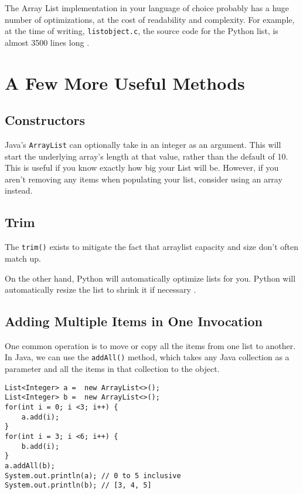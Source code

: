 The Array List implementation in your language of choice probably has a huge number of optimizations, at the cost of readability and complexity.  For example, at the time of writing, \texttt{listobject.c}, the source code for the Python list, is almost 3500 lines long \cite{py-list-source}.



\section{A Few More Useful Methods}

\subsection{Constructors}
Java's \texttt{ArrayList} can optionally take in an integer as an argument.
This will start the underlying array's length at that value, rather than the default of 10.
This is useful if you know exactly how big your List will be.  
However, if you aren't removing any items when populating your list, consider using an array instead.

\subsection{Trim}

The \texttt{trim()} exists to mitigate the fact that arraylist capacity and size don't often match up.



On the other hand, Python will automatically optimize lists for you.  Python will automatically resize the list to shrink it if necessary \cite{py-list-source}.


\subsection{Adding Multiple Items in One Invocation}
One common operation is to move or copy all the items from one list to another.
In Java, we can use the \texttt{addAll()} method, which takes any Java collection as a parameter and all the items in that collection to the object.

\begin{verbatim}
List<Integer> a =  new ArrayList<>();
List<Integer> b =  new ArrayList<>();
for(int i = 0; i <3; i++) { 
	a.add(i); 
}
for(int i = 3; i <6; i++) { 
	b.add(i); 
}
a.addAll(b);
System.out.println(a); // 0 to 5 inclusive
System.out.println(b); // [3, 4, 5]
\end{verbatim}

